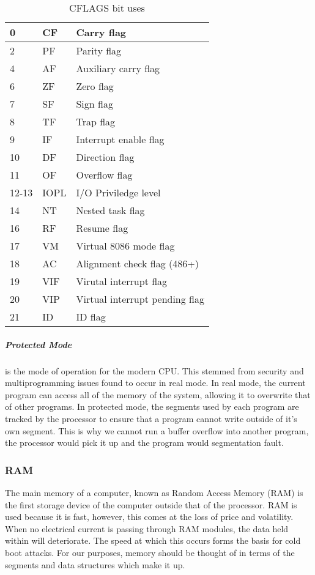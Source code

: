 \documentclass[a4paper,11pt]{article}
\begin{document}
\begin{itemize}
\begin{table}[htb]
\begin{tabular}{| l | l | l |}
									0   &   CF &     Carry flag \\ \hline
									2   &   PF   &   Parity flag \\ \hline
									4   &   AF   &   Auxiliary carry flag \\ \hline
									6   &   ZF   &   Zero flag \\ \hline
									7   &   SF   &   Sign flag \\ \hline
									8   &   TF   &   Trap flag \\ \hline
									9   &   IF   &   Interrupt enable flag \\ \hline
									10  &   DF   &   Direction flag \\ \hline
									11  &   OF   &   Overflow flag \\ \hline
									12-13 & IOPL &   I/O Priviledge level \\ \hline
									14  &   NT   &   Nested task flag \\ \hline
									16  &   RF   &   Resume flag \\ \hline
									17  &   VM   &   Virtual 8086 mode flag \\ \hline
									18  &   AC   &   Alignment check flag (486+) \\ \hline
									19  &   VIF  &   Virutal interrupt flag \\ \hline
									20  &   VIP  &   Virtual interrupt pending flag \\ \hline
									21  &   ID   &   ID flag \\ \hline
							\end{tabular}
								\caption{CFLAGS bit uses}
								\label{tab:CFLAGSBits}
							\end{table}
				\end{itemize}
			\subparagraph{Protected Mode} 
				is the mode of operation for the modern CPU. 
				This stemmed from security and multiprogramming issues found to occur in real mode. 
				In real mode, the current program can access all of the memory of the system, allowing it to overwrite that of other programs. 
				In protected mode, the segments used by each program are tracked by the processor to ensure that a program cannot write outside of it's own segment. 
				This is why we cannot run a buffer overflow into another program, the processor would pick it up and the program would segmentation fault. 
				\subsubsection{RAM}
					The main memory of a computer, known as Random Access Memory (RAM) is the first storage device of the computer outside that of the processor. 
					RAM is used because it is fast, however, this comes at the loss of price and volatility. 
					When no electrical current is passing through RAM modules, the data held within will deteriorate. 
					The speed at which this occurs forms the basis for cold boot attacks. %
					For our purposes, memory should be thought of in terms of the segments and data structures which make it up. 
\end{document}
